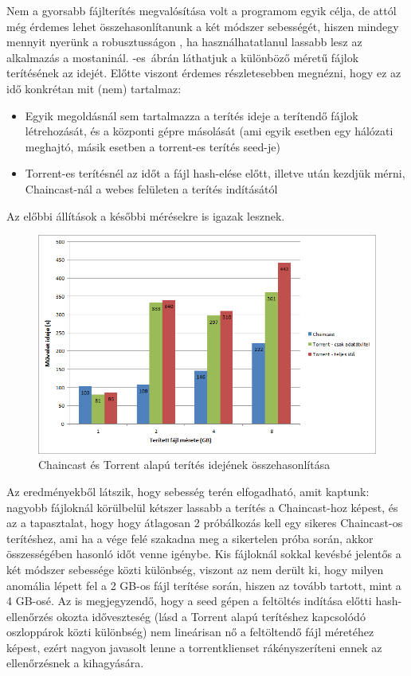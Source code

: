 Nem a gyorsabb fájlterítés megvalósítása volt a programom egyik célja, de attól még érdemes lehet összehasonlítanunk a két módszer sebességét, hiszen mindegy mennyit nyerünk a robusztusságon , ha használhatatlanul lassabb lesz az alkalmazás a mostaninál. -es~ábrán láthatjuk a különböző méretű fájlok terítésének az idejét. Előtte viszont érdemes részletesebben megnézni, hogy ez az idő konkrétan mit (nem) tartalmaz:

\begin{itemize}
  \item Egyik megoldásnál sem tartalmazza a terítés ideje a terítendő fájlok létrehozását, és a központi gépre másolását (ami egyik esetben egy hálózati meghajtó, másik esetben a torrent-es terítés seed-je)
  \item Torrent-es terítésnél az időt a fájl hash-elése előtt, illetve után kezdjük mérni, Chaincast-nál a webes felületen a terítés indításától
\end{itemize}

Az előbbi állítások a későbbi mérésekre is igazak lesznek.

\begin{figure}[ht]
\centering
\includegraphics[width=150mm, keepaspectratio]{figures/Perf_chaincast_torrent_comparison.png}
\caption{Chaincast és Torrent alapú terítés idejének összehasonlítása}
\label{fig:chaincasttorrrentcomparison}
\end{figure}

Az eredményekből látszik, hogy sebesség terén elfogadható, amit kaptunk: nagyobb fájloknál körülbelül kétszer lassabb a terítés a Chaincast-hoz képest, és az a tapasztalat, hogy hogy átlagosan 2 próbálkozás kell egy sikeres Chaincast-os terítéshez, ami ha a vége felé szakadna meg a sikertelen próba során, akkor összességében hasonló időt venne igénybe. Kis fájloknál sokkal kevésbé jelentős a két módszer sebessége közti különbség, viszont az nem derült ki, hogy milyen anomália lépett fel a 2 GB-os fájl terítése során, hiszen az tovább tartott, mint a 4 GB-osé. Az is megjegyzendő, hogy a seed gépen a feltöltés indítása előtti hash-ellenőrzés okozta időveszteség (lásd a Torrent alapú terítéshez kapcsolódó oszloppárok közti különbség) nem lineárisan nő a feltöltendő fájl méretéhez képest, ezért nagyon javasolt lenne a torrentklienset rákényszeríteni ennek az ellenőrzésnek a kihagyására.

